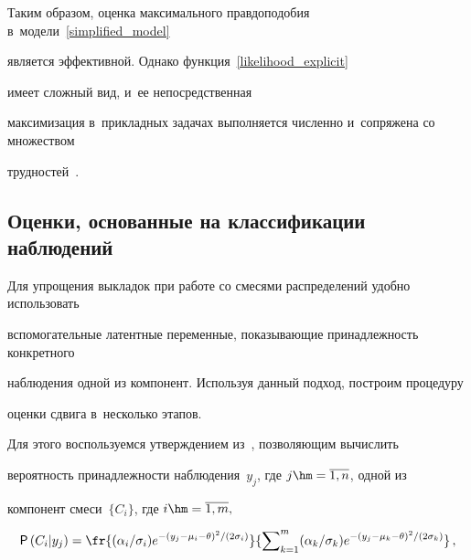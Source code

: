 \smallskip











Таким образом, оценка максимального правдоподобия в~модели~\eqref{simplified_model} 


является эффективной. Однако функция~\eqref{likelihood_explicit} 


имеет сложный вид, и~ее непосредственная 


максимизация в~прикладных задачах выполняется численно и~сопряжена со множеством 


трудностей~\cite{korolev}.








\subsection{Оценки, основанные на классификации наблюдений}








Для упрощения выкладок при работе со смесями распределений удобно использовать 


вспомогательные латентные переменные, показывающие принадлежность конкретного 


наблюдения одной из компонент. Используя данный подход, построим процедуру 


оценки сдвига в~несколько этапов.


Для этого воспользуемся утверждением из~\cite{korolev}, позволяющим вычислить 


вероятность принадлежности наблюдения~$y_j$, где $j \hm= \overline{1,n}$, одной из 


компонент смеси~$\{C_i\}$, где $i \hm= \overline{1,m},$


\begin{equation}


\label{prob_of_component}


{\sf P}\left(C_i|y_j\right) = \fr{({\alpha_i}/{\sigma_i})e^{{-\left(y_j - \mu_i - 


\theta\right)^2}/\left({2\sigma_i}\right)}}{\sum\nolimits_{k=1}^m ({\alpha_k}/{\sigma_k})


e^{{-


\left(y_j - \mu_k - \theta\right)^2}/({2\sigma_k})}}\,,


\end{equation}


